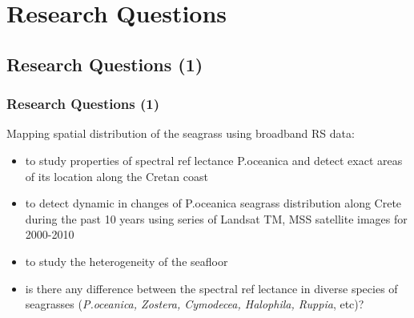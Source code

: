 \documentclass[pdflatex,compress,8pt,
	xcolor={dvipsnames,dvipsnames,svgnames,x11names,table},
	hyperref={colorlinks = true,breaklinks = true, urlcolor = NavyBlue, breaklinks = true}]{beamer}
\begin{document}
\section{Research Questions}
\subsection{Research Questions (1)}
\begin{frame}\frametitle{Research Questions (1)}
Mapping spatial distribution of the seagrass using broadband RS data:
\begin{itemize}
	\item to study properties of spectral ref lectance P.oceanica and detect exact areas of its location along the Cretan coast
	\item to detect dynamic in changes of P.oceanica seagrass distribution along Crete during the past 10 years using series of Landsat TM, MSS satellite images for 2000-2010
	\item to study the heterogeneity of the seafloor
	\item is there any difference between the spectral ref lectance in diverse species of seagrasses (\emph{P.oceanica, Zostera, Cymodecea, Halophila, Ruppia}, etc)?
\end{itemize}
\end{frame}
\end{document}
